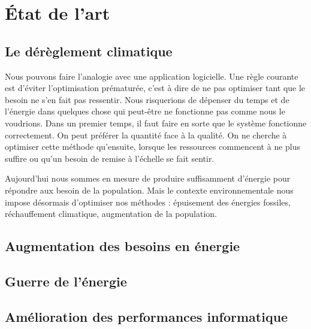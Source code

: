 \chapter{État de l’art}

\section{Le dérèglement climatique}
Nous pouvons faire l’analogie avec une application logicielle. Une règle courante est d’éviter l’optimisation prématurée, c’est à dire de ne pas optimiser tant que le besoin ne s’en fait pas ressentir. Nous risquerions de dépenser du temps et de l'énergie dans quelques chose qui peut-être ne fonctionne pas comme nous le voudrions.
Dans un premier temps, il faut faire en sorte que le système fonctionne correctement. On peut préférer la quantité face à la qualité. On ne cherche à optimiser cette méthode qu’ensuite, lorsque les ressources commencent à ne plus suffire ou qu’un besoin de remise à l’échelle se fait sentir. 

Aujourd’hui nous sommes en mesure de produire suffisamment d’énergie pour répondre aux besoin de la population. Mais le contexte environnementale nous impose désormais d’optimiser nos méthodes : épuisement des énergies fossiles, réchauffement climatique, augmentation de la population.  


\section{Augmentation des besoins en énergie}
\section{Guerre de l'énergie}
\section{Amélioration des performances informatique}
